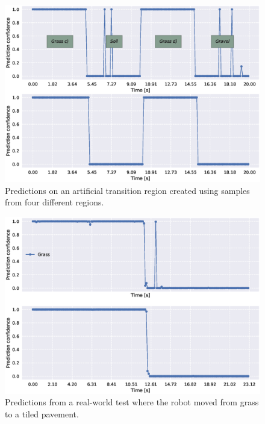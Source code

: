 \begin{figure}
	\centering
	\includegraphics[scale=0.5]{figs_temp/varmats2}
	\caption{Predictions on an artificial transition region created using samples from four different regions.}
	\label{fig:artificial2}
\end{figure}

\begin{figure}
	\centering
	\includegraphics[scale=0.5]{figs_temp/transition_grass_tiles_grass}
	\caption{Predictions from a real-world test where the robot moved from grass to a tiled pavement.} 
	\label{fig:trans_tgtg}
\end{figure}

